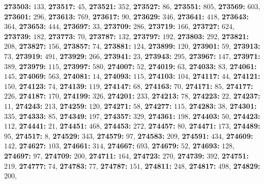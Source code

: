 \textsf{\bfseries 273503:} $133$, \textsf{\bfseries 273517:} $45$, \textsf{\bfseries 273521:} $352$, \textsf{\bfseries 273527:} $86$, \textsf{\bfseries 273551:} $805$, \textsf{\bfseries 273569:} $603$, \textsf{\bfseries 273601:} $296$, \textsf{\bfseries 273613:} $769$, \textsf{\bfseries 273617:} $90$, \textsf{\bfseries 273629:} $346$, \textsf{\bfseries 273641:} $418$, \textsf{\bfseries 273643:} $364$, \textsf{\bfseries 273653:} $444$, \textsf{\bfseries 273697:} $33$, \textsf{\bfseries 273709:} $286$, \textsf{\bfseries 273719:} $166$, \textsf{\bfseries 273727:} $624$, \textsf{\bfseries 273739:} $182$, \textsf{\bfseries 273773:} $70$, \textsf{\bfseries 273787:} $132$, \textsf{\bfseries 273797:} $192$, \textsf{\bfseries 273803:} $292$, \textsf{\bfseries 273821:} $208$, \textsf{\bfseries 273827:} $156$, \textsf{\bfseries 273857:} $74$, \textsf{\bfseries 273881:} $124$, \textsf{\bfseries 273899:} $120$, \textsf{\bfseries 273901:} $59$, \textsf{\bfseries 273913:} $73$, \textsf{\bfseries 273919:} $491$, \textsf{\bfseries 273929:} $266$, \textsf{\bfseries 273941:} $23$, \textsf{\bfseries 273943:} $295$, \textsf{\bfseries 273967:} $147$, \textsf{\bfseries 273971:} $389$, \textsf{\bfseries 273979:} $115$, \textsf{\bfseries 273997:} $580$, \textsf{\bfseries 274007:} $52$, \textsf{\bfseries 274019:} $63$, \textsf{\bfseries 274033:} $83$, \textsf{\bfseries 274061:} $145$, \textsf{\bfseries 274069:} $563$, \textsf{\bfseries 274081:} $14$, \textsf{\bfseries 274093:} $115$, \textsf{\bfseries 274103:} $104$, \textsf{\bfseries 274117:} $44$, \textsf{\bfseries 274121:} $150$, \textsf{\bfseries 274123:} $74$, \textsf{\bfseries 274139:} $119$, \textsf{\bfseries 274147:} $68$, \textsf{\bfseries 274163:} $70$, \textsf{\bfseries 274171:} $85$, \textsf{\bfseries 274177:} $226$, \textsf{\bfseries 274187:} $170$, \textsf{\bfseries 274199:} $326$, \textsf{\bfseries 274201:} $233$, \textsf{\bfseries 274213:} $78$, \textsf{\bfseries 274223:} $22$, \textsf{\bfseries 274237:} $11$, \textsf{\bfseries 274243:} $213$, \textsf{\bfseries 274259:} $120$, \textsf{\bfseries 274271:} $58$, \textsf{\bfseries 274277:} $115$, \textsf{\bfseries 274283:} $38$, \textsf{\bfseries 274301:} $335$, \textsf{\bfseries 274333:} $85$, \textsf{\bfseries 274349:} $197$, \textsf{\bfseries 274357:} $329$, \textsf{\bfseries 274361:} $198$, \textsf{\bfseries 274403:} $50$, \textsf{\bfseries 274423:} $112$, \textsf{\bfseries 274441:} $21$, \textsf{\bfseries 274451:} $468$, \textsf{\bfseries 274453:} $272$, \textsf{\bfseries 274457:} $80$, \textsf{\bfseries 274471:} $173$, \textsf{\bfseries 274489:} $95$, \textsf{\bfseries 274517:} $8$, \textsf{\bfseries 274529:} $343$, \textsf{\bfseries 274579:} $97$, \textsf{\bfseries 274583:} $209$, \textsf{\bfseries 274591:} $434$, \textsf{\bfseries 274609:} $142$, \textsf{\bfseries 274627:} $103$, \textsf{\bfseries 274661:} $314$, \textsf{\bfseries 274667:} $693$, \textsf{\bfseries 274679:} $52$, \textsf{\bfseries 274693:} $128$, \textsf{\bfseries 274697:} $97$, \textsf{\bfseries 274709:} $200$, \textsf{\bfseries 274711:} $164$, \textsf{\bfseries 274723:} $270$, \textsf{\bfseries 274739:} $392$, \textsf{\bfseries 274751:} $219$, \textsf{\bfseries 274777:} $74$, \textsf{\bfseries 274783:} $77$, \textsf{\bfseries 274787:} $151$, \textsf{\bfseries 274811:} $248$, \textsf{\bfseries 274817:} $498$, \textsf{\bfseries 274829:} $200$, 
